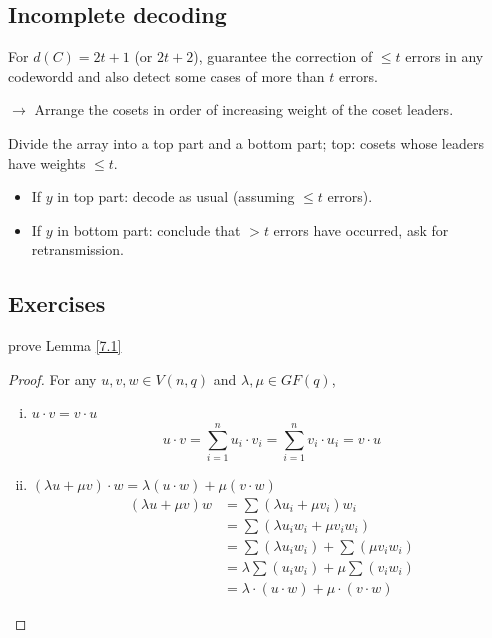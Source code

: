 \documentclass{article}
\theoremstyle{definition}
\newenvironment{ex}[1]
{\renewcommand\theinnerex{#1}\innerex}
{\endinnerex}
\newcommand{\Vnq}{V(n, q)}
\begin{document}
\subsection{Incomplete decoding}
For $d(C)= 2t +1$ (or $2t+2$), guarantee the correction of $\leq t$ errors in any codewordd and also detect some cases of more than $t$ errors.

$\longrightarrow$ Arrange the cosets in order of increasing weight of the coset leaders.

Divide the array into a top part and a bottom part; top: cosets whose leaders have weights $\leq t$.

\begin{itemize}
  \item[-] If $y$ in top part: decode as usual (assuming $\leq t$ errors).
  \item[-] If $y$ in bottom part: conclude that $>t$ errors have occurred, ask for retransmission.
\end{itemize}

\subsection{Exercises}

\begin{ex}{7.1} \label{ex.7.1}
  prove Lemma \ref{7.1}
\end{ex}
\begin{proof}
  For any $u,v,w \in \Vnq$ and $\lambda, \mu \in GF(q)$,
  \begin{enumerate}[i.]
    \item $u \cdot v = v \cdot u$
      $$u \cdot v = \sum_{i=1}^n u_i \cdot v_i = \sum_{i=1}^n v_i \cdot u_i = v \cdot u$$
    \item $(\lambda u + \mu v) \cdot w = \lambda(u \cdot w) + \mu (v \cdot w)$
    \begin{align*}
      (\lambda u + \mu v) w &= \sum(\lambda u_i + \mu v_i) w_i\\
                            &= \sum (\lambda u_i w_i + \mu v_i w_i)\\
                            &= \sum (\lambda u_i w_i) + \sum (\mu v_i w_i)\\
                            &= \lambda \sum(u_i w_i) + \mu \sum (v_i w_i)\\
                            &= \lambda \cdot (u \cdot w) + \mu \cdot (v \cdot w)
    \end{align*}
  \end{enumerate}
\end{proof}
\end{document}
